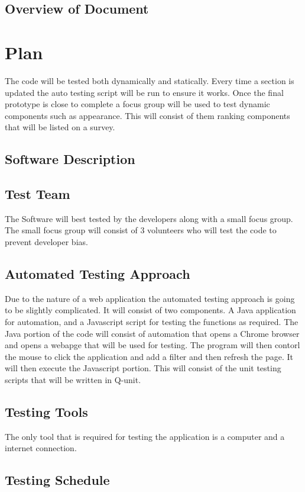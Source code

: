 \documentclass[12pt, titlepage]{article}
\begin{document}
\subsection{Overview of Document}
\section{Plan}
The code will be tested both dynamically and statically. Every time a section is updated the auto testing script will be run to ensure it works. Once the final prototype is close to complete a focus group will be used to test dynamic components such as appearance. This will consist of them ranking components that will be listed on a survey.	
\subsection{Software Description}
\subsection{Test Team}
The Software will best tested by the developers along with a small focus group. The small focus group will consist of 3 volunteers who will test the code to prevent developer bias. 
\subsection{Automated Testing Approach}
Due to the nature of a web application the automated testing approach is going to be slightly complicated. It will consist of two components. A Java application for automation, and a Javascript script for testing the functions as required. The Java portion of the code will consist of automation that opens a Chrome browser and opens a webapge that will be used for testing. The program will then contorl the mouse to click the application and add a filter and then refresh the page. It will then execute the Javascript portion. This will consist of the unit testing scripts that will be written in Q-unit. 
\subsection{Testing Tools}
The only tool that is required for testing the application is a computer and a internet connection.
\subsection{Testing Schedule}
		
\end{document}
